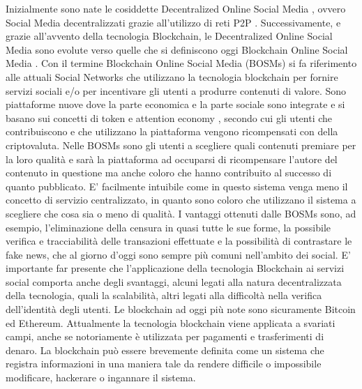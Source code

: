 Inizialmente sono nate le cosiddette Decentralized Online Social Media \cite{guidi2016didusonet}, ovvero Social Media decentralizzati grazie all'utilizzo di reti P2P \cite{datta2010decentralized}.
Successivamente, e grazie all'avvento della tecnologia Blockchain, le Decentralized Online Social Media sono evolute verso quelle che si definiscono oggi Blockchain Online Social Media \cite{guidi2020blockchain}.
Con il termine Blockchain Online Social Media (BOSMs) si fa riferimento alle attuali Social Networks che utilizzano la tecnologia blockchain per fornire servizi sociali e/o per incentivare gli utenti a produrre contenuti di valore. Sono piattaforme nuove dove la parte economica e la parte sociale sono integrate e si basano sui concetti di token e attention economy \cite{kazdin2012token} \cite{davenport2001attention}, secondo cui gli utenti che contribuiscono e che utilizzano la piattaforma vengono ricompensati con della criptovaluta.
Nelle BOSMs sono gli utenti a scegliere quali contenuti premiare per la loro qualità e sarà la piattaforma ad occuparsi di ricompensare l'autore del contenuto in questione ma anche coloro che hanno contribuito al successo di quanto pubblicato. E' facilmente intuibile come in questo sistema venga meno il concetto di servizio centralizzato, in quanto sono coloro che utilizzano il sistema a scegliere che cosa sia o meno di qualità. I vantaggi ottenuti dalle BOSMs sono, ad esempio, l'eliminazione della censura in quasi tutte le sue forme, la possibile verifica e tracciabilità delle transazioni effettuate e la possibilità di contrastare le fake news, che al giorno d'oggi sono sempre più comuni nell'ambito dei social.
E' importante far presente che l'applicazione della tecnologia Blockchain ai servizi social comporta anche degli svantaggi, alcuni legati alla natura decentralizzata della tecnologia, quali la scalabilità, altri legati alla difficoltà nella verifica dell'identità degli utenti.
Le blockchain ad oggi più note sono sicuramente Bitcoin ed Ethereum. Attualmente la tecnologia blockchain viene applicata a svariati campi, anche se notoriamente è utilizzata per pagamenti e trasferimenti di denaro. La blockchain può essere brevemente definita come un sistema che registra informazioni in una maniera tale da rendere difficile o impossibile modificare, hackerare o ingannare il sistema.

